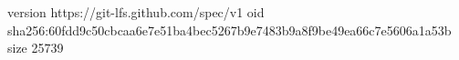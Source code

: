 version https://git-lfs.github.com/spec/v1
oid sha256:60fdd9c50cbcaa6e7e51ba4bec5267b9e7483b9a8f9be49ea66c7e5606a1a53b
size 25739
